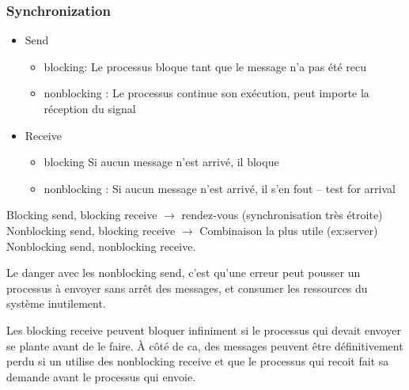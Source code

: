 \subsubsection{Synchronization}
\begin{itemize}
  \item Send
    \begin{itemize}
      \item blocking: Le processus bloque tant que le message n'a pas été recu
      \item nonblocking : Le processus continue son exécution, peut importe la réception du signal
    \end{itemize}
  \item Receive
    \begin{itemize}
      \item blocking Si aucun message n'est arrivé, il bloque
      \item nonblocking : Si aucun message n'est arrivé, il s'en fout – test for arrival
    \end{itemize}
\end{itemize}
Blocking send, blocking receive $\to$ rendez-vous (synchronisation très étroite) Nonblocking send,
blocking receive $\to$ Combinaison la plus utile (ex:server) Nonblocking send, nonblocking receive.

Le danger avec les nonblocking send, c'est qu'une erreur peut pousser un processus à envoyer sans arrêt des messages, et consumer les ressources du système inutilement.

Les blocking receive peuvent bloquer infiniment si le processus qui devait envoyer se plante avant de le faire.
À côté de ca, des messages peuvent être définitivement perdu si un utilise des nonblocking receive et que le processus qui recoit fait sa demande avant le processus qui envoie.

